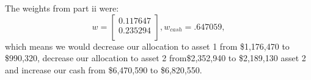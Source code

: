 \documentclass{article}
\begin{document}
The weights from part ii were:
\begin{equation*}
w = %
\begin{bmatrix}{}
 0.117647 \\ 
  0.235294 \\ 
  \end{bmatrix},
w_{cash} = .647059,
\end{equation*}
which means we would decrease our allocation to asset 1 from \$1,176,470 to \$990,320, decrease our allocation to asset 2 from\$2,352,940 to \$2,189,130 asset 2 and increase our cash from \$6,470,590 to \$6,820,550.
\end{document}
